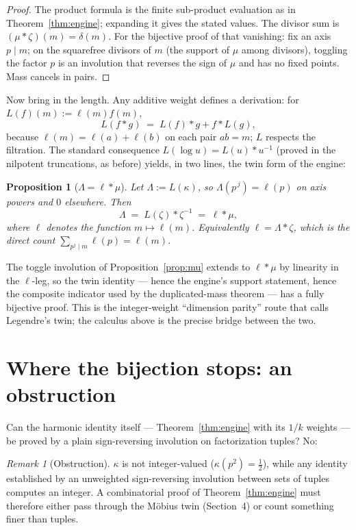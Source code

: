 \documentclass[11pt]{article}
\newtheorem{proposition}{Proposition}
\theoremstyle{remark}
\newtheorem{remark}{Remark}
\begin{document}
\begin{proof}
The product formula is the finite sub-product evaluation as in Theorem~\ref{thm:engine}; expanding
it gives the stated values. The divisor sum is $(\mu * \zeta)(m) = \delta(m)$. For the bijective
proof of that vanishing: fix an axis $p \mid m$; on the squarefree divisors of $m$ (the support of
$\mu$ among divisors), toggling the factor $p$ is an involution that reverses the sign of $\mu$
and has no fixed points. Mass cancels in pairs.
\end{proof}

Now bring in the length. Any additive weight defines a derivation: for
$L(f)(m) := \ell(m) f(m)$,
\[
L(f * g) \;=\; L(f) * g + f * L(g),
\]
because $\ell(m) = \ell(a) + \ell(b)$ on each pair $ab = m$; $L$ respects the filtration. The
standard consequence $L(\log u) = L(u) * u^{-1}$ (proved in the nilpotent truncations, as before)
yields, in two lines, the twin form of the engine:

\begin{proposition}[$\Lambda = \ell * \mu$]\label{prop:twin}
Let $\Lambda := L(\kappa)$, so $\Lambda(p^{\,j}) = \ell(p)$ on axis powers and $0$ elsewhere.
Then
\[
\Lambda \;=\; L(\zeta) * \zeta^{-1} \;=\; \ell * \mu ,
\]
where $\ell$ denotes the function $m \mapsto \ell(m)$. Equivalently $\ell = \Lambda * \zeta$,
which is the direct count $\sum_{p^{j} \mid m} \ell(p) = \ell(m)$.
\end{proposition}

The toggle involution of Proposition~\ref{prop:mu} extends to $\ell * \mu$ by linearity in the
$\ell$-leg, so the twin identity --- hence the engine's support statement, hence the composite
indicator used by the duplicated-mass theorem --- has a fully bijective proof. This is the
integer-weight ``dimension parity'' route that \cite{CompanionI} calls Legendre's twin; the
calculus above is the precise bridge between the two.

\section{Where the bijection stops: an obstruction}

Can the harmonic identity itself --- Theorem~\ref{thm:engine} with its $1/k$ weights --- be proved
by a plain sign-reversing involution on factorization tuples? No:

\begin{remark}[Obstruction]\label{rem:obstruction}
$\kappa$ is not integer-valued ($\kappa(p^2) = \tfrac12$), while any identity established by an
unweighted sign-reversing involution between sets of tuples computes an integer. A combinatorial
proof of Theorem~\ref{thm:engine} must therefore either pass through the M\"obius twin (Section~4)
or count something finer than tuples.
\end{remark}
\end{document}
